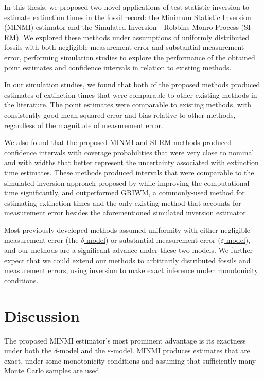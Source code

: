 
In this thesis, we proposed two novel applications of test-statistic inversion to estimate extinction times in the fossil record: the Minimum Statistic Inversion (MINMI) estimator and the Simulated Inversion - Robbins Monro Process (SI-RM). We explored these methods under assumptions of uniformly distributed fossils with both negligible measurement error and substantial measurement error, performing simulation studies to explore the performance of the obtained point estimates and confidence intervals in relation to existing methods.

In our simulation studies, we found that both of the proposed methods produced estimates of extinction times that were comparable to other existing methods in the literature. The point estimates were comparable to existing methods, with consistently good mean-squared error and bias relative to other methods, regardless of the magnitude of measurement error.

We also found that the proposed MINMI and SI-RM methods produced confidence intervals with coverage probabilities that were very close to nominal and with widths that better represent the uncertainty associated with extinction time estimates. These methods produced intervals that were comparable to the simulated inversion approach proposed by \citet{Huang2019} while improving the computational time significantly, and outperformed GRIWM, a commonly-used method for estimating extinction times and the only existing method that accounts for measurement error besides the aforementioned simulated inversion estimator.

Most previously developed methods assumed uniformity with either negligible measurement error (the \hyperref[model: no-measurement-error]{$\delta$-model}) or substantial measurement error (\hyperref[model: measurement-error]{$\varepsilon$-model}), and our methods are a significant advance under these two models. We further expect that we could extend our methods to arbitrarily distributed fossils and measurement errors, using inversion to make exact inference under monotonicity conditions.

\section{Discussion}

The proposed MINMI estimator's most prominent advantage is its exactness under both the \hyperref[model: no-measurement-error]{$\delta$-model} and the \hyperref[model: measurement-error]{$\varepsilon$-model}. MINMI produces estimates that are exact, under some monotonicity conditions and assuming that sufficiently many Monte Carlo samples are used.

